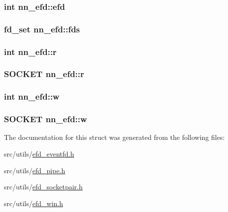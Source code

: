 \subsubsection[{efd}]{\setlength{\rightskip}{0pt plus 5cm}int nn\+\_\+efd\+::efd}\hypertarget{structnn__efd_a754cb58e2b0a2efed6e5aa81a98275e0}{}\label{structnn__efd_a754cb58e2b0a2efed6e5aa81a98275e0}
\subsubsection[{fds}]{\setlength{\rightskip}{0pt plus 5cm}fd\+\_\+set nn\+\_\+efd\+::fds}\hypertarget{structnn__efd_a97f26e7918650b84462a101e2dd40d49}{}\label{structnn__efd_a97f26e7918650b84462a101e2dd40d49}
\subsubsection[{r}]{\setlength{\rightskip}{0pt plus 5cm}int nn\+\_\+efd\+::r}\hypertarget{structnn__efd_a83da20c603791c11e137bf0411c33edd}{}\label{structnn__efd_a83da20c603791c11e137bf0411c33edd}
\subsubsection[{r}]{\setlength{\rightskip}{0pt plus 5cm}S\+O\+C\+K\+ET nn\+\_\+efd\+::r}\hypertarget{structnn__efd_ab5890557c42eae3e980c7c7b35e13ca6}{}\label{structnn__efd_ab5890557c42eae3e980c7c7b35e13ca6}
\subsubsection[{w}]{\setlength{\rightskip}{0pt plus 5cm}int nn\+\_\+efd\+::w}\hypertarget{structnn__efd_a871578e6e6cbf91469323f57655bb9db}{}\label{structnn__efd_a871578e6e6cbf91469323f57655bb9db}
\subsubsection[{w}]{\setlength{\rightskip}{0pt plus 5cm}S\+O\+C\+K\+ET nn\+\_\+efd\+::w}\hypertarget{structnn__efd_a23bfc263f640b579e1a7846c7f3b81a0}{}\label{structnn__efd_a23bfc263f640b579e1a7846c7f3b81a0}


The documentation for this struct was generated from the following files\+:\begin{DoxyCompactItemize}
\item 
src/utils/\hyperlink{efd__eventfd_8h}{efd\+\_\+eventfd.\+h}\item 
src/utils/\hyperlink{efd__pipe_8h}{efd\+\_\+pipe.\+h}\item 
src/utils/\hyperlink{efd__socketpair_8h}{efd\+\_\+socketpair.\+h}\item 
src/utils/\hyperlink{efd__win_8h}{efd\+\_\+win.\+h}\end{DoxyCompactItemize}
